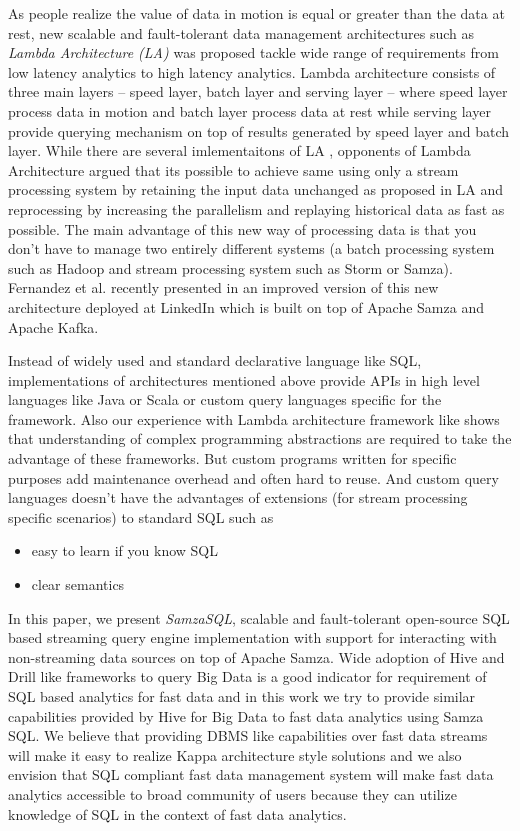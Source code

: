 \documentclass[10pt, conference, compsocconf]{IEEEtran}
\begin{document}
As people realize the value of data in motion is equal or greater than the data at rest, new scalable and fault-tolerant data management architectures such as \textit{Lambda Architecture (LA)} was proposed tackle wide range of requirements from low latency analytics to high latency analytics. Lambda architecture consists of three main layers -- speed layer, batch layer and serving layer -- where speed layer process data in motion and batch layer process data at rest while serving layer provide querying mechanism on top of results generated by speed layer and batch layer.  While there are several imlementaitons of LA \cite{boykin2014summingbird} \cite{metamarkets:radstack}, opponents of Lambda Architecture argued \cite{questions-la-kreps} that its possible to achieve same using only a stream processing system by retaining the input data unchanged as proposed in LA and reprocessing by increasing the parallelism and replaying historical data as fast as possible. The main advantage of this new way of processing data is that you don't have to manage two entirely different systems (a batch processing system such as Hadoop and stream processing system such as Storm or Samza). Fernandez et al. recently presented in \cite{fernandezliquid} an improved version of this new architecture deployed at LinkedIn which is built on top of Apache Samza and Apache Kafka.  

Instead of widely used and standard declarative language like SQL, implementations of architectures mentioned above provide APIs in high level languages like Java \cite{samza:api} or Scala \cite{boykin2014summingbird} or custom query languages \cite{metamarkets:radstack} specific for the framework. Also our experience with Lambda architecture framework like \cite{boykin2014summingbird} shows that understanding of complex programming abstractions are required to take the advantage of these frameworks. But custom programs written for specific purposes add maintenance overhead and often hard to reuse. And custom query languages doesn't have the advantages of extensions (for stream processing specific scenarios) to standard SQL such as

\begin{itemize}
  \item easy to learn if you know SQL
  \item clear semantics
\end{itemize}

In this paper, we present \textit{SamzaSQL}, scalable and fault-tolerant open-source SQL based streaming query engine implementation with support for interacting with non-streaming data sources on top of Apache Samza. Wide adoption of Hive and Drill like frameworks to query Big Data is a good indicator for requirement of SQL based analytics for fast data and in this work we try to provide similar capabilities provided by Hive for Big Data to fast data analytics using Samza SQL. We believe that providing DBMS like capabilities over fast data streams will make it easy to realize Kappa architecture style solutions and we also envision that SQL compliant fast data management system will make fast data analytics accessible to broad community of users because they can utilize knowledge of SQL in the context of fast data analytics.
\end{document}
